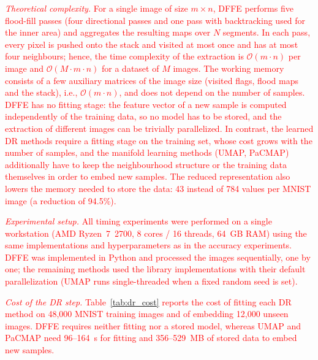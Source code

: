 \documentclass[a4paper,fleqn]{cas-dc}
\begin{document}
\textcolor{red}{\textit{Theoretical complexity.} For a single image of size $m \times n$, DFFE performs five flood-fill passes (four directional passes and one pass with backtracking used for the inner area) and aggregates the resulting maps over $N$ segments. In each pass, every pixel is pushed onto the stack and visited at most once and has at most four neighbours; hence, the time complexity of the extraction is $\mathcal{O}(m \cdot n)$ per image and $\mathcal{O}(M \cdot m \cdot n)$ for a dataset of $M$ images. The working memory consists of a few auxiliary matrices of the image size (visited flags, flood maps and the stack), i.e., $\mathcal{O}(m \cdot n)$, and does not depend on the number of samples. DFFE has no fitting stage: the feature vector of a new sample is computed independently of the training data, so no model has to be stored, and the extraction of different images can be trivially parallelized. In contrast, the learned DR methods require a fitting stage on the training set, whose cost grows with the number of samples, and the manifold learning methods (UMAP, PaCMAP) additionally have to keep the neighbourhood structure or the training data themselves in order to embed new samples. The reduced representation also lowers the memory needed to store the data: 43 instead of 784 values per MNIST image (a reduction of 94.5\%).}

\textcolor{red}{\textit{Experimental setup.} All timing experiments were performed on a single workstation (AMD Ryzen~7~2700, 8 cores / 16 threads, 64~GB RAM) using the same implementations and hyperparameters as in the accuracy experiments. DFFE was implemented in Python and processed the images sequentially, one by one; the remaining methods used the library implementations with their default parallelization (UMAP runs single-threaded when a fixed random seed is set).}

\textcolor{red}{\textit{Cost of the DR step.} Table~\ref{tab:dr_cost} reports the cost of fitting each DR method on 48{,}000 MNIST training images and of embedding 12{,}000 unseen images. DFFE requires neither fitting nor a stored model, whereas UMAP and PaCMAP need 96--164~s for fitting and 356--529~MB of stored data to embed new samples.}
\end{document}
